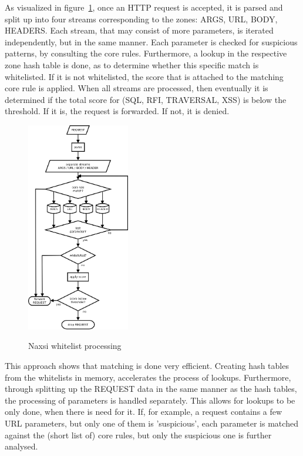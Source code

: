 \documentclass[Naxsi]{subfiles}
\begin{document}
As visualized in figure~\ref{fig:whitelist_processing}, once an HTTP request is accepted, it is parsed and split up into four streams corresponding to the zones: ARGS, URL, BODY, HEADERS. Each stream, that may consist of more parameters, is iterated independently, but in the same manner. Each parameter is checked for suspicious patterns, by consulting the core rules. Furthermore, a lookup in the respective zone hash table is done, as to determine whether this specific match is whitelisted. If it is not whitelisted, the score that is attached to the matching core rule is applied. When all streams are processed, then eventually it is determined if the total score for (SQL, RFI, TRAVERSAL, XSS) is below the threshold. If it is, the request is forwarded. If not, it is denied. 

\begin{figure}[H]
\caption{Naxsi whitelist processing}
\centering
\includegraphics[width=0.4\textwidth] {images/whitelist_processing.png}
\label{fig:whitelist_processing}
\end{figure}

This approach shows that matching is done very efficient. Creating hash tables from the whitelists in memory, accelerates the process of lookups. Furthermore, through splitting up the REQUEST data in the same manner as the hash tables, the processing of parameters is handled separately. This allows for lookups to be only done, when there is need for it. If, for example, a request contains a few URL parameters, but only one of them is 'suspicious', each parameter is matched against the (short list of) core rules, but only the suspicious one is further analysed.
\end{document}
